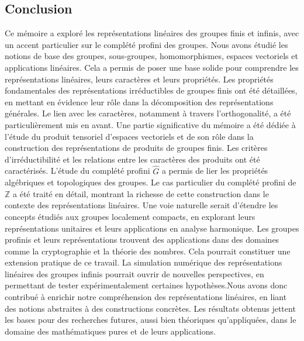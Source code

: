 \documentclass[a4paper, 14pt]{report}
\newcommand{\applyfontsize}{%
	\fontsize{12}{12}\selectfont
}
\begin{document}
\begin{onehalfspace}
{\chapter*{Conclusion}
{
	\applyfontsize %
	
Ce mémoire a exploré les représentations linéaires des groupes finis et infinis, avec un accent particulier sur le complété profini des groupes. 
Nous avons étudié les notions de base des groupes, sous-groupes, homomorphismes, espaces vectoriels et applications linéaires. Cela a permis de poser une base solide pour comprendre les représentations linéaires, leurs caractères et leurs propriétés.
Les propriétés fondamentales des représentations irréductibles de groupes finis ont été détaillées, en mettant en évidence leur rôle dans la décomposition des représentations générales. Le lien avec les caractères, notamment à travers l’orthogonalité, a été particulièrement mis en avant.
Une partie significative du mémoire a été dédiée à l'étude du produit tensoriel d'espaces vectoriels et de son rôle dans la construction des représentations de produits de groupes finis. Les critères d’irréductibilité et les relations entre les caractères des produits ont été caractérisés.
 L’étude du complété profini $\widehat{G}$ a permis de lier les propriétés algébriques et topologiques des groupes. Le cas particulier du complété profini de $\mathbb{Z}$ a été traité en détail, montrant la richesse de cette construction dans le contexte des représentations linéaires. Une voie naturelle serait d’étendre les concepts étudiés aux groupes localement compacts, en explorant leurs représentations unitaires et leurs applications en analyse harmonique. Les groupes profinis et leurs représentations trouvent des applications dans des domaines comme la cryptographie et la théorie des nombres. Cela pourrait constituer une extension pratique de ce travail. La simulation numérique des représentations linéaires des groupes infinis pourrait ouvrir de nouvelles perspectives, en permettant de tester expérimentalement certaines hypothèses.Nous avons donc  contribué à enrichir notre compréhension des représentations linéaires, en liant des notions abstraites à des constructions concrètes. Les résultats obtenus jettent les bases pour des recherches futures, aussi bien théoriques qu’appliquées, dans le domaine des mathématiques pures et de leurs applications.
	
}

}
\end{onehalfspace}
\end{document}
